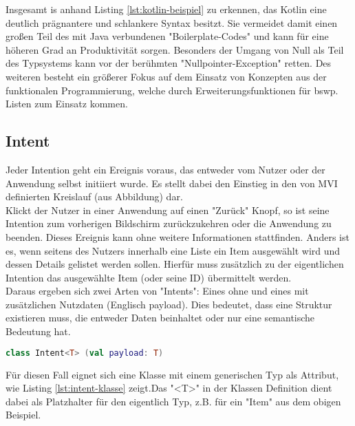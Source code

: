 \bigskip
Insgesamt is anhand Listing
\ref{lst:kotlin-beispiel}
zu erkennen, das Kotlin eine deutlich prägnantere und schlankere Syntax besitzt. Sie vermeidet damit einen großen Teil des mit Java verbundenen "Boilerplate-Codes" und kann für eine höheren Grad an Produktivität sorgen. Besonders der Umgang von Null als Teil des Typsystems kann vor der berühmten "Nullpointer-Exception" retten. Des weiteren besteht ein größerer Fokus auf dem Einsatz von Konzepten aus der funktionalen Programmierung, welche durch Erweiterungsfunktionen für bswp. Listen zum Einsatz kommen.

\subsection{Intent}
Jeder Intention geht ein Ereignis voraus, das entweder vom Nutzer oder der Anwendung selbst initiiert wurde. Es stellt dabei den Einstieg in den von MVI definierten Kreislauf (aus Abbildung) dar. 
\\
Klickt der Nutzer in einer Anwendung auf einen "Zurück" Knopf, so ist seine Intention zum vorherigen Bildschirm zurückzukehren oder die Anwendung zu beenden. Dieses Ereignis kann ohne weitere Informationen stattfinden. Anders ist es, wenn seitens des Nutzers innerhalb eine Liste ein Item ausgewählt wird und dessen Details gelistet werden sollen. Hierfür muss zusätzlich zu der eigentlichen Intention das ausgewählte Item (oder seine ID) übermittelt werden.
\\
Daraus ergeben sich zwei Arten von "Intents": Eines ohne und eines mit zusätzlichen Nutzdaten (Englisch payload). Dies bedeutet, dass eine Struktur existieren muss, die entweder Daten beinhaltet oder nur eine semantische Bedeutung hat.
\begin{lstlisting}[caption={Intent Klasse}, label={lst:intent-klasse}, language=Kotlin]
class Intent<T> (val payload: T)
\end{lstlisting}
\bigskip
Für diesen Fall eignet sich eine Klasse mit einem generischen Typ als Attribut, wie Listing
\ref{lst:intent-klasse}
zeigt.Das "<T>" in der Klassen Definition dient dabei als Platzhalter für den eigentlich Typ, z.B. für ein "Item" aus dem obigen Beispiel.
\\



